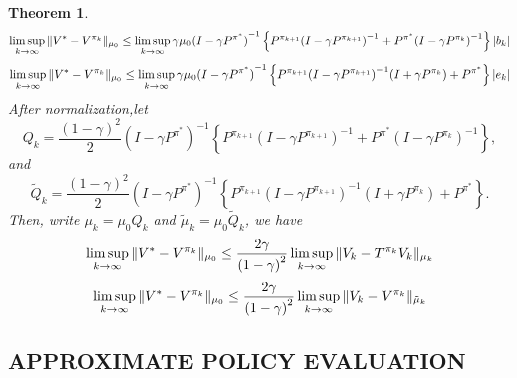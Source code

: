 \documentclass[a4paper]{article}
\newtheorem{theorem}{Theorem}
\begin{document}
\begin{theorem}
    \[
        \limsup_{k \rightarrow \infty} \Arrowvert V^* - V^{\pi_k} \Arrowvert_{\mu_0}
        \le \limsup_{k \rightarrow \infty}\gamma \mu_0 {(I - \gamma P^{\pi^*})}^{-1} \left\{  P^{\pi_{k+1}}{( I - \gamma P^{\pi_{k+1}})}^{-1} + P^{\pi^*} {(I - \gamma P^{\pi_k})}^{-1}\right\} \left| b_k \right|
    \]
    \[
        \limsup_{k \rightarrow \infty} \Arrowvert V^* - V^{\pi_k} \Arrowvert_{\mu_0}
        \le \limsup_{k \rightarrow \infty}\gamma \mu_0 {(I - \gamma P^{\pi^*})}^{-1} \left\{ P^{\pi_{k+1}}{( I - \gamma P^{\pi_{k+1}})}^{-1} (I + \gamma P^{\pi_k}) + P^{\pi^*} \right\} \left| e_k \right|
    \]
    After normalization,let
    \[
        Q_k = \frac{{(1 - \gamma)}^2}{2}  {(I - \gamma P^{\pi^*})}^{-1} \left\{  P^{\pi_{k+1}}{( I - \gamma P^{\pi_{k+1}})}^{-1} + P^{\pi^*} {(I - \gamma P^{\pi_k})}^{-1}\right\},
    \]
    and
    \[
        \tilde Q_k = \frac{{(1 - \gamma)}^{2}}{2} {(I - \gamma P^{\pi^*})}^{-1} \left\{ P^{\pi_{k+1}}{( I - \gamma P^{\pi_{k+1}})}^{-1} (I + \gamma P^{\pi_k}) + P^{\pi^*} \right\}.
    \]
    Then, write $ \mu_k = \mu_0 Q_k $ and $ \tilde \mu_k = \mu_0 \tilde Q_k $, we have
    \[
        \limsup_{k \rightarrow \infty} \Arrowvert V^* - V^{\pi_k} \Arrowvert_{\mu_0} \le \frac{2\gamma}{{(1 - \gamma)}^{2}}  \limsup_{k \rightarrow \infty} \Arrowvert V_k - T^{\pi_k } V_k \Arrowvert_{\mu_k}
    \]
    \[
        \limsup_{k \rightarrow \infty} \Arrowvert V^* - V^{\pi_k} \Arrowvert_{\mu_0} \le \frac{2 \gamma}{{(1 - \gamma)}^{2}} \limsup_{k \rightarrow \infty} \Arrowvert V_k - V^{\pi_k} \Arrowvert_{\tilde \mu_k}
    \]
\end{theorem}

\subsection{APPROXIMATE POLICY EVALUATION}%
\end{document}
